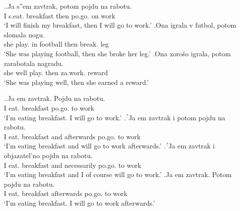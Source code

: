 \ex.\ag.\label{breakfast:potom}Ja s''em\textsuperscript{\PF} zavtrak, potom pojdu\textsuperscript{\PF} na rabotu.\\
I s.eat. breakfast then po.go. on work\\
\trans `I will finish my breakfast, then I will go to work.'
\bg.\label{football:potom}Ona igrala\textsuperscript{\IPF} v futbol, potom slomala\textsuperscript{\PF} nogu.\\
she play. in football then break. leg\\
\trans `She was playing football, then she broke her leg.'
\bg.\label{ex:cause:potom}Ona xoro\v{s}o igrala\textsuperscript{\IPF}, potom zarabotala\textsuperscript{\PF} nagradu.\\
she well play. then za.work. reward\\
\trans `She was playing well, then she earned a reward.'

\ex.\label{test3}\ag.\label{test31}Ja em\textsuperscript{\IPF} zavtrak. Pojdu\textsuperscript{\PF} na rabotu.\\ 
I eat. breakfast po.go. to work\\
\trans `I'm eating breakfast. I will go to work.'
\bg.\label{test32}$^?$Ja em\textsuperscript{\IPF} zavtrak i potom pojdu\textsuperscript{\PF} na rabotu.\\ 
I eat. breakfast and afterwards po.go. to work\\
\trans `I'm eating breakfast and will go to work afterwards.'
\bg.\label{test33}$^?$Ja em\textsuperscript{\IPF} zavtrak i objazatel’no pojdu\textsuperscript{\PF} na rabotu.\\
I eat. breakfast and necessarily po.go. to work\\
\trans `I'm eating breakfast and I of course will go to work.'
\bg.\label{test34}Ja em\textsuperscript{\IPF} zavtrak. Potom pojdu\textsuperscript{\PF} na rabotu.\\
I eat. breakfast afterwards po.go. to work\\
\trans `I'm eating breakfast. I will go to work afterwards.'

